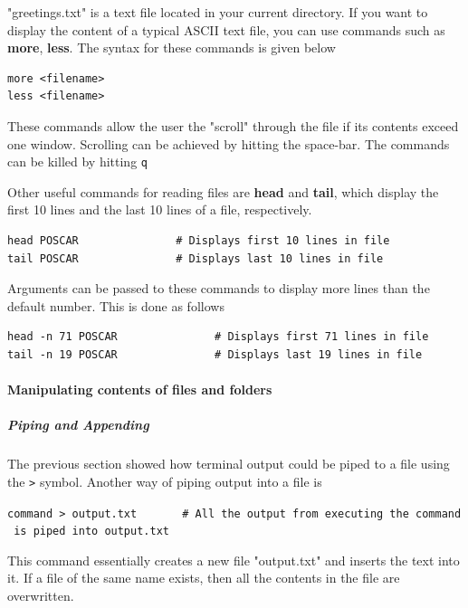 \documentclass[11pt]{article}
\begin{document}
    "greetings.txt" is a text file located in your current directory. If you
want to display the content of a typical ASCII text file, you can use
commands such as \textbf{more}, \textbf{less}. The syntax for these
commands is given below

\begin{verbatim}
more <filename>
less <filename>
\end{verbatim}

These commands allow the user the "scroll" through the file if its
contents exceed one window. Scrolling can be achieved by hitting the
space-bar. The commands can be killed by hitting \texttt{q}

Other useful commands for reading files are \textbf{head} and
\textbf{tail}, which display the first 10 lines and the last 10 lines of
a file, respectively.

\begin{verbatim}
head POSCAR               # Displays first 10 lines in file
tail POSCAR               # Displays last 10 lines in file
\end{verbatim}

Arguments can be passed to these commands to display more lines than the
default number. This is done as follows

\begin{verbatim}
head -n 71 POSCAR               # Displays first 71 lines in file
tail -n 19 POSCAR               # Displays last 19 lines in file
\end{verbatim}

    \paragraph{Manipulating contents of files and
folders}\label{manipulating-contents-of-files-and-folders}

\subparagraph{Piping and Appending}\label{piping-and-appending}

The previous section showed how terminal output could be piped to a file
using the \texttt{\textgreater{}} symbol. Another way of piping output
into a file is

\texttt{command\ \textgreater{}\ output.txt\ \ \ \ \ \ \ \#\ All\ the\ output\ from\ executing\ the\ command\ is\ piped\ into\ output.txt}

This command essentially creates a new file "output.txt" and inserts the
text into it. If a file of the same name exists, then all the contents
in the file are overwritten.
\end{document}
